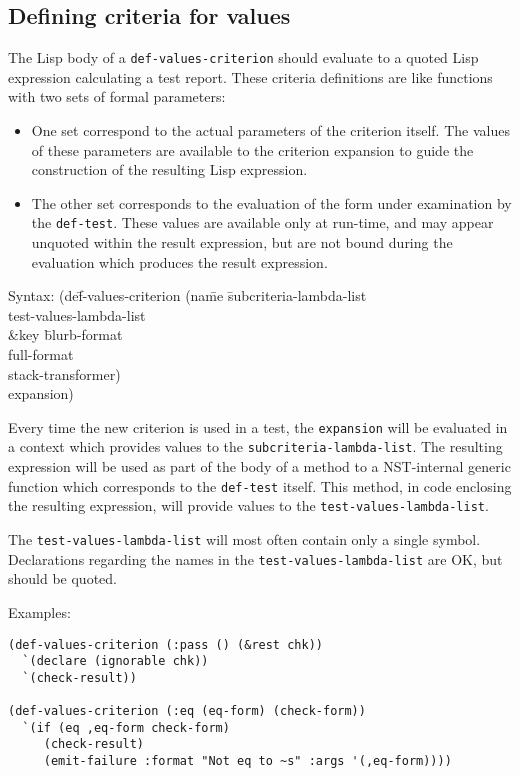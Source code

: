 \subsection{Defining criteria for values}
\label{sec:def-values-criterion}
The Lisp body of a \texttt{def-values-criterion} should evaluate to a
quoted Lisp expression calculating a test report.  These criteria
definitions are like functions with two sets of formal parameters:
\begin{itemize}
\item One set correspond to the actual parameters of the criterion
  itself.  The values of these parameters are available to the
  criterion expansion to guide the construction of the resulting Lisp
  expression.
\item The other set corresponds to the evaluation of the form under
  examination by the \texttt{def-test}.  These values are available
  only at run-time, and may appear unquoted within the result
  expression, but are not bound during the evaluation which produces
  the result expression.
\end{itemize}
% 
{\ttfamily\begin{tabbing}
\textrm{Syntax: 
}(de\=f-values-criterion (na\=me \=subcriteria-lambda-list
\\ \> \> \> test-values-lambda-list
\\ \> \> \&key \= blurb-format
\\ \> \>        \> full-format
\\ \> \>        \> stack-transformer)
\\ \> expansion)
\end{tabbing}}
%
Every time the new criterion is used in a test, the \texttt{expansion}
will be evaluated in a context which provides values to the
\texttt{subcriteria-lambda-list}.  The resulting expression will be
used as part of the body of a method to a NST-internal generic
function which corresponds to the \texttt{def-test} itself.  This
method, in code enclosing the resulting expression, will provide
values to the \texttt{test-values-lambda-list}.

The \texttt{test-values-lambda-list} will most often contain only a
single symbol.  Declarations regarding the names in the
\texttt{test-values-lambda-list} are OK, but should be quoted.

Examples:
\begin{verbatim}
(def-values-criterion (:pass () (&rest chk))
  `(declare (ignorable chk))
  `(check-result))

(def-values-criterion (:eq (eq-form) (check-form))
  `(if (eq ,eq-form check-form)
     (check-result)
     (emit-failure :format "Not eq to ~s" :args '(,eq-form))))
\end{verbatim}

